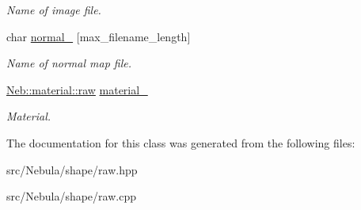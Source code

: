 \begin{DoxyCompactItemize}
\begin{DoxyCompactList}\small\item\em \-Name of image file. \end{DoxyCompactList}\item 
\hypertarget{classNeb_1_1Shape_1_1Raw_a8d5db26dbd8b92368a4a0e024053d134}{char \hyperlink{classNeb_1_1Shape_1_1Raw_a8d5db26dbd8b92368a4a0e024053d134}{normal\-\_\-} \mbox{[}max\-\_\-filename\-\_\-length\mbox{]}}\label{classNeb_1_1Shape_1_1Raw_a8d5db26dbd8b92368a4a0e024053d134}

\begin{DoxyCompactList}\small\item\em \-Name of normal map file. \end{DoxyCompactList}\item 
\hypertarget{classNeb_1_1Shape_1_1Raw_aae71583852d98c27b381ff0d5262d5fa}{\hyperlink{structNeb_1_1material_1_1raw}{\-Neb\-::material\-::raw} \hyperlink{classNeb_1_1Shape_1_1Raw_aae71583852d98c27b381ff0d5262d5fa}{material\-\_\-}}\label{classNeb_1_1Shape_1_1Raw_aae71583852d98c27b381ff0d5262d5fa}

\begin{DoxyCompactList}\small\item\em \-Material. \end{DoxyCompactList}\end{DoxyCompactItemize}


\-The documentation for this class was generated from the following files\-:\begin{DoxyCompactItemize}
\item 
src/\-Nebula/shape/raw.\-hpp\item 
src/\-Nebula/shape/raw.\-cpp\end{DoxyCompactItemize}
